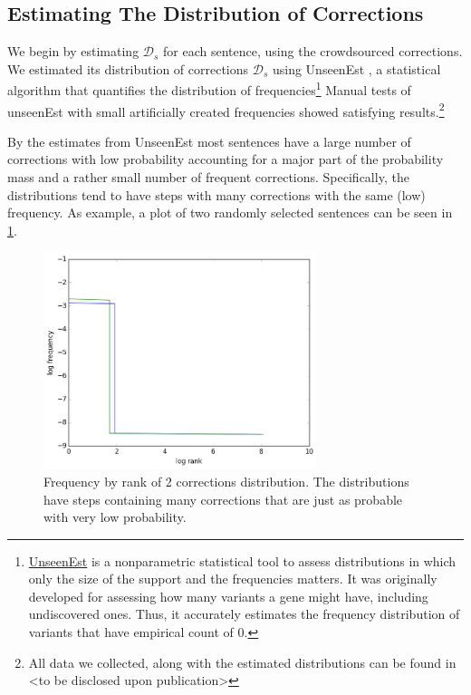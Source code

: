 \documentclass[letter,11pt]{article}
\begin{document}
		\subsection{Estimating The Distribution of Corrections}
		
		We begin by estimating $\mathcal{D}_s$ for each sentence, using the crowdsourced
		corrections. We estimated its distribution of corrections $\mathcal{D}_s$
		using {\sc UnseenEst} \cite{zou2015quantifying}, a statistical algorithm that quantifies
		the distribution of frequencies\footnote{\href{https://github.com/borgr/unseenest}{UnseenEst} is a nonparametric statistical tool to assess distributions in which only the size of the support and the frequencies matters. It was originally developed for assessing how many variants a gene might have, including undiscovered ones. Thus, it accurately estimates the frequency distribution of variants that have empirical count of 0. } Manual tests of unseenEst with small artificially created frequencies showed
		satisfying results.\footnote{All data
			we collected, along with the estimated distributions can be found in <to be disclosed
			upon publication>}
		
		By the estimates from {\sc UnseenEst} most sentences have a large number of corrections with low probability accounting for a major part of the probability mass and a rather small number of frequent corrections. Specifically, the distributions tend to have steps with many corrections with the same (low) frequency. As example, a plot of two randomly selected sentences can be seen in \ref{fig:corrections_dist}.
		
		\begin{figure}
			\includegraphics[width = 8cm]{exact_dists_plot}
			\caption{Frequency by rank of 2 corrections distribution. The distributions have steps containing many corrections that are just as probable with very low probability. 	\label{fig:corrections_dist}}
		\end{figure}
		
\end{document}
